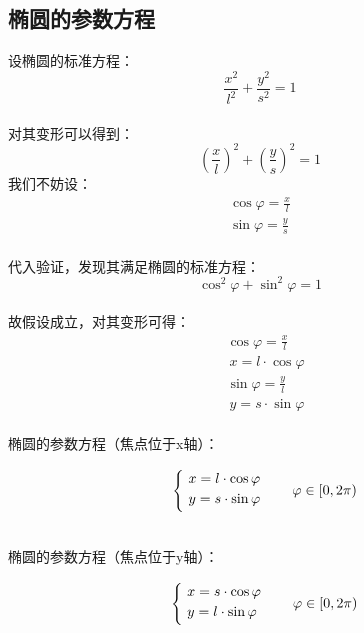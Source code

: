 \documentclass[UTF8]{ctexart}
\begin{document}
\subsection{椭圆的参数方程}
    设椭圆的标准方程：
    \setcounter{equation}{0}
    \begin{equation}
        \frac{x^2}{l^2}+\frac{y^2}{s^2}=1
    \end{equation}\\
    对其变形可以得到：
    \begin{equation}
        \left(\frac{x}{l}\right)^2+\left(\frac{y}{s}\right)^2=1
    \end{equation}
    我们不妨设：
    \begin{align}
        \cos{\varphi}=\frac{x}{l}\\[4mm]
        \sin{\varphi}=\frac{y}{s}
    \end{align}\\
    代入验证，发现其满足椭圆的标准方程：
    \begin{equation}
        \cos^2{\varphi}+\sin^2{\varphi}=1
    \end{equation}\\
    故假设成立，对其变形可得：
    \begin{align}
        &\cos{\varphi}=\frac{x}{l}\\[3mm]
        &~x=l\cdot\cos{\varphi}\\[6mm]
        &\sin{\varphi}=\frac{y}{l}\\[3mm]
        &~y=s\cdot\sin{\varphi}
    \end{align}\\
    椭圆的参数方程（焦点位于x轴）：
    \begin{large}
        \begin{equation*}
            ~~~~\begin{cases}
                ~x=l\cdot\cos{\varphi}\\
                ~y=s\cdot\sin{\varphi}\vspace{3pt}
            \end{cases}\quad\varphi\in[0,2\pi)~~
        \end{equation*}
    \end{large}\\[1mm]
    椭圆的参数方程（焦点位于y轴）：
    \begin{large}
        \begin{equation*}
            ~~~~\begin{cases}
                ~x=s\cdot\cos{\varphi}\\
                ~y=l\cdot\sin{\varphi}\vspace{3pt}
            \end{cases}\quad\varphi\in[0,2\pi)~~
        \end{equation*}
    \end{large}\\
\end{document}
